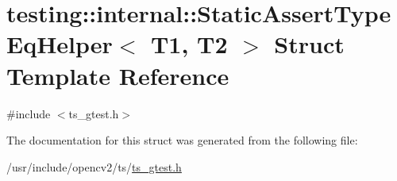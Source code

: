 \hypertarget{structtesting_1_1internal_1_1StaticAssertTypeEqHelper}{\section{testing\-:\-:internal\-:\-:Static\-Assert\-Type\-Eq\-Helper$<$ T1, T2 $>$ Struct Template Reference}
\label{structtesting_1_1internal_1_1StaticAssertTypeEqHelper}
}


{\ttfamily \#include $<$ts\-\_\-gtest.\-h$>$}



The documentation for this struct was generated from the following file\-:\begin{DoxyCompactItemize}
\item 
/usr/include/opencv2/ts/\hyperlink{ts__gtest_8h}{ts\-\_\-gtest.\-h}\end{DoxyCompactItemize}
